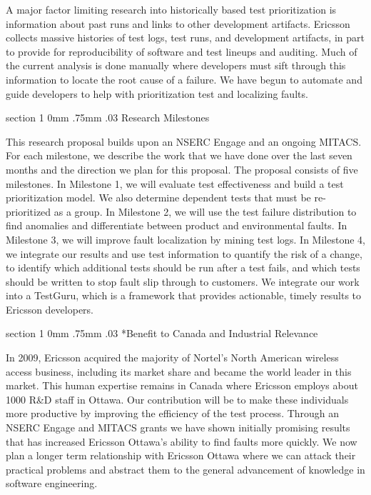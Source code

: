 \documentclass[12pt, letterpaper]{article}
\makeatletter
\renewcommand{\section}{\@startsection
{section}%
{1}%
{0mm}%
{.75mm}
{.03\baselineskip}%
{\normalfont\large\bf} %
}
\makeatother
\begin{document}
A major factor limiting research into historically based test prioritization is
information about past runs and links to other development artifacts.  Ericsson
collects massive histories of test logs, test runs, and development artifacts, in
part to provide for reproducibility of software and test lineups and auditing.
Much of the current analysis is done manually where developers must sift
through this information to locate the root cause of a failure. We have begun
to automate and guide developers to help with prioritization test and
localizing faults.



\section{Research Milestones} 

This research proposal builds upon an NSERC Engage and an ongoing MITACS. For
each milestone, we describe the work that we have done over the last seven months
and the direction we plan for this proposal. The proposal consists of five 
milestones. In Milestone 1, we will evaluate test effectiveness and build a
test prioritization model. We also determine dependent tests that must be re-prioritized as a group. In Milestone 2, we will use the test failure
distribution to find anomalies and differentiate between product and
environmental faults. In Milestone 3, we will improve fault localization by
mining test logs. In Milestone 4, we integrate our results and use test
information to quantify the risk of a change, to identify which additional
tests should be run after a test fails, and which tests should be written to
stop fault slip through to customers.  We integrate our work into a TestGuru, which is a framework
that provides actionable, timely results to Ericsson developers.













\section*{Benefit to Canada and Industrial Relevance}

In 2009, Ericsson acquired the majority of Nortel's North American wireless
access business, including its market share and became the world leader in this
market. This human expertise remains in Canada where Ericsson employs about
1000 R\&D staff in Ottawa. Our contribution will be to make these individuals
more productive by improving the efficiency of the test process. Through an
NSERC Engage and MITACS grants we have shown initially promising results that
has increased Ericsson Ottawa's ability to find faults more quickly. We now
plan a longer term relationship with Ericsson Ottawa where we can attack their
practical problems and abstract them to the general advancement of knowledge in
software engineering.


\pagebreak


\end{document}
